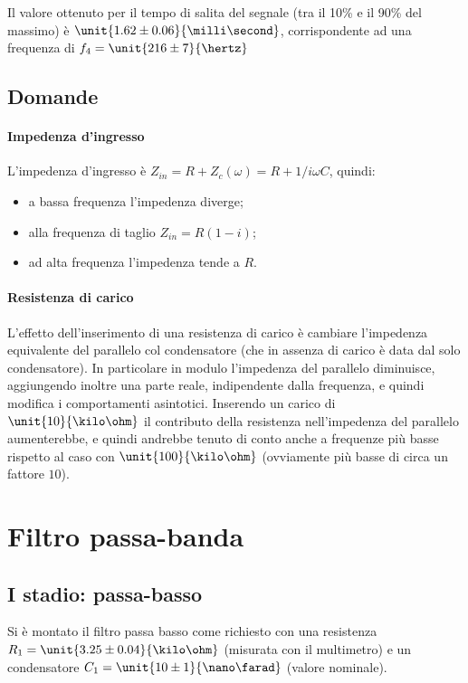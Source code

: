 \documentclass[10pt,a4paper]{article}
\begin{document}
Il valore ottenuto per il tempo di salita del segnale (tra il 10\% e il 90\% del massimo) è $\unit{1.62 \pm 0.06}{\milli\second}$, corrispondente ad una frequenza di $f_4 = \unit{216 \pm 7}{\hertz}$

\subsection{Domande}

\paragraph{Impedenza d'ingresso} L'impedenza d'ingresso è $Z_{in} = R + Z_c(\omega) = R + 1/i\omega C$, quindi:
\begin{itemize}
\item a bassa frequenza l'impedenza diverge;
\item alla frequenza di taglio $Z_{in} = R(1-i)$;
\item ad alta frequenza l'impedenza tende a $R$.
\end{itemize}

\paragraph{Resistenza di carico} L'effetto dell'inserimento di una resistenza di carico è cambiare l'impedenza equivalente del parallelo col condensatore (che in assenza di carico è data dal solo condensatore). In particolare in modulo l'impedenza del parallelo diminuisce, aggiungendo inoltre una parte reale, indipendente dalla frequenza, e quindi modifica i comportamenti asintotici.
Inserendo un carico di $\unit{10}{\kilo\ohm}$ il contributo della resistenza nell'impedenza del parallelo aumenterebbe, e quindi andrebbe tenuto di conto anche a frequenze più basse rispetto al caso con $\unit{100}{\kilo\ohm}$ (ovviamente più basse di circa un fattore $10$).

\section{Filtro passa-banda}

\subsection{I stadio: passa-basso}

Si è montato il filtro passa basso come richiesto con una resistenza $R_1 = \unit{3.25 \pm 0.04}{\kilo\ohm}$ (misurata con il multimetro) e un condensatore $C_1=\unit{10 \pm 1}{\nano\farad}$ (valore nominale).
\end{document}
